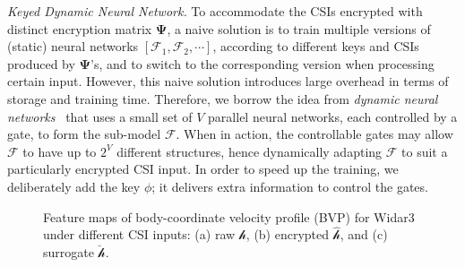 \documentclass[conference,compsoc]{IEEEtran}
\begin{document}
\vspace{.5ex}
\emph{Keyed Dynamic Neural Network.}
To accommodate the CSIs encrypted with distinct encryption matrix $\bm{\Psi}$, a naive solution is to train multiple versions of (static) neural networks $[\mathcal{F}_1, \mathcal{F}_2, \cdots ]$, according to different keys and CSIs produced by $\bm{\Psi}$'s, and to switch to the corresponding version when processing certain input. However, this naive solution introduces large overhead in terms of storage and training time. Therefore, we borrow the idea from \textit{dynamic neural networks}~\cite{DNN-TPAMI} that uses a small set of $V$ parallel neural networks, each controlled by a gate, to form the sub-model $\mathcal{F}$. When in action, the controllable gates may allow $\mathcal{F}$ to have up to $2^V$ different structures, hence dynamically adapting $\mathcal{F}$ to suit a particularly encrypted CSI input. In order to speed up the training, we deliberately add the key $\phi$; it delivers extra information to control the gates.
%
\begin{figure}[t]
	\setlength\abovecaptionskip{8pt}
	\vspace{-1ex}
	\centering
	\caption{Feature maps of body-coordinate velocity profile (BVP) for Widar3 under different CSI inputs: (a) raw $\bm{\mathcal{h}}$, (b) encrypted $\hat{\bm{\mathcal{h}}}$, and (c) surrogate $\breve{\bm{\mathcal{h}}}$.}
	\label{fig:sensingBVP}
	\vspace{-1ex}
\end{figure}
\end{document}
